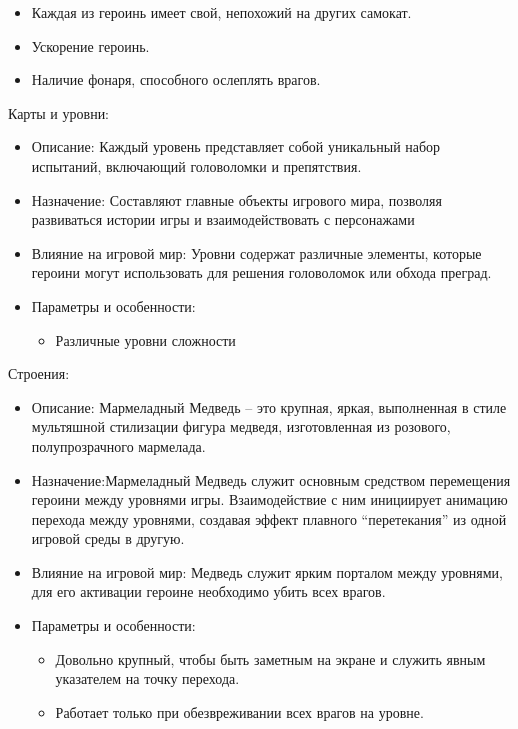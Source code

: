 \documentclass[article,12pt, fleqn]{article}
\begin{document}
\begin{itemize}
\begin{itemize}
        \begin{itemize}
            \item Каждая из героинь имеет свой, непохожий на других самокат.
             \item Ускорение героинь.
              \item Наличие фонаря, способного ослеплять врагов.
        \end{itemize}
    \end{itemize}
Карты и уровни: 
    \begin{itemize}
        \item Описание: Каждый уровень представляет собой уникальный набор испытаний, включающий головоломки и препятствия.
        \item Назначение: Составляют главные объекты игрового мира, позволяя развиваться истории игры и взаимодействовать с персонажами
        \item Влияние на игровой мир: Уровни содержат различные элементы, которые героини могут использовать для решения головоломок или обхода преград.
        \item Параметры и особенности: 
        \begin{itemize}
            \item Различные уровни сложности
        \end{itemize}
    \end{itemize}
Строения: 
    \begin{itemize}
        \item Описание: Мармеладный Медведь – это крупная, яркая, выполненная в стиле мультяшной стилизации фигура медведя, изготовленная из розового, полупрозрачного мармелада. 
        \item Назначение:Мармеладный Медведь служит основным средством перемещения героини между уровнями игры. Взаимодействие с ним инициирует анимацию перехода между уровнями, создавая эффект плавного “перетекания” из одной игровой среды в другую.
        \item Влияние на игровой мир: Медведь служит ярким порталом между уровнями, для его активации героине необходимо убить всех врагов.
        \item Параметры и особенности: 
        \begin{itemize}
            \item Довольно крупный, чтобы быть заметным на экране и служить явным указателем на точку перехода.
            \item Работает только при обезвреживании всех врагов на уровне.
        \end{itemize}
    \end{itemize}



\end{itemize}
\end{document}
